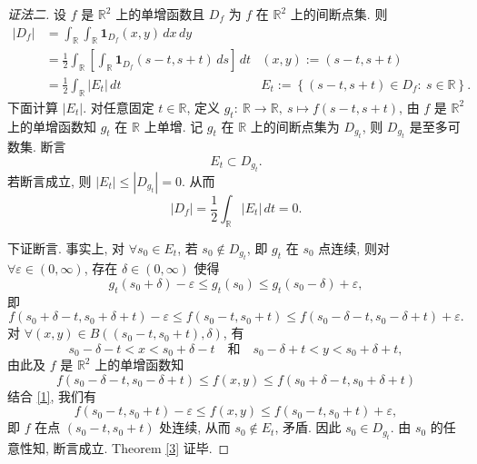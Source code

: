 \documentclass[a4paper,11pt]{article}
\theoremstyle{definition}
\begin{document}
\begin{CJK*}{UTF8}{gbsn}
\begin{proof}[证法二]
    设 $ f $ 是 $ \mathbb{R}^2 $ 上的单增函数且 $ D_f $ 为 $ f $ 在 $ \mathbb{R}^2 $ 上的间断点集.
    则
    \begin{align*}
        |D_f| &= \int_\mathbb{R} \int_\mathbb{R} \mathbf{1}_{D_f}(x, y) \, dx \, dy \\
              &= \frac{1}{2} \int_\mathbb{R} \left[ \int_\mathbb{R} \mathbf{1}_{D_f}(s - t, s + t) \, ds \right] \, dt
                & (x, y) := (s - t, s + t) \\
              &= \frac{1}{2} \int_\mathbb{R} |E_t| \, dt
                & E_t := \left\{ (s - t, s + t) \in D_f :\ s \in \mathbb{R} \right\}.
    \end{align*}
    下面计算 $ |E_t| $. 
    对任意固定 $ t \in \mathbb{R} $, 定义 $ g_t :\ \mathbb{R} \to \mathbb{R},\ s \mapsto f(s - t, s + t) $,
    由 $ f $ 是 $ \mathbb{R}^2 $ 上的单增函数知 $ g_t $ 在 $ \mathbb{R} $ 上单增.
    记 $ g_t $ 在 $ \mathbb{R} $ 上的间断点集为 $ D_{g_t} $, 则 $ D_{g_t} $ 是至多可数集. 断言 
    $$ 
        E_t \subset D_{g_t}.
    $$
    若断言成立, 则 $ |E_t| \leq |D_{g_t}| = 0 $. 从而
    $$
        |D_f| = \frac{1}{2} \int_\mathbb{R} |E_t| \, dt = 0.
    $$
    
    下证断言. 事实上, 对 $ \forall s_0 \in E_t $, 若 $ s_0 \notin D_{g_t} $,
    即 $ g_t $ 在 $ s_0 $ 点连续, 则对 $ \forall \varepsilon \in (0, \infty) $, 存在 $ \delta \in (0, \infty) $
    使得
    $$  
        g_t(s_0 + \delta) - \varepsilon \leq g_t(s_0) \leq g_t(s_0 - \delta) + \varepsilon,
    $$
    即
    \begin{equation}  \label{1}
        f(s_0 + \delta - t, s_0 + \delta + t) - \varepsilon
            \leq f(s_0 - t, s_0 + t) \leq f(s_0 - \delta - t, s_0 - \delta + t) + \varepsilon.
    \end{equation} 
    对 $ \forall (x, y) \in B((s_0 - t, s_0 + t), \delta) $, 有
    $$ 
        s_0 - \delta - t < x < s_0 + \delta - t
        \quad\text{和}\quad
        s_0 - \delta + t < y < s_0 + \delta + t,
    $$
    由此及 $ f $ 是 $ \mathbb{R}^2 $ 上的单增函数知
    $$
        f(s_0 - \delta - t, s_0 - \delta + t) \leq f(x, y) \leq f(s_0 + \delta - t, s_0 + \delta + t)
    $$
    结合 \eqref{1}, 我们有
    $$
        f(s_0 - t, s_0 + t) - \varepsilon \leq f(x, y) \leq f(s_0 - t, s_0 + t) + \varepsilon,
    $$
    即 $ f $ 在点 $ (s_0 - t, s_0 + t) $ 处连续, 从而 $ s_0 \notin E_t $, 矛盾. 因此 $ s_0 \in D_{g_t} $.
    由 $ s_0 $ 的任意性知, 断言成立. 
    Theorem \ref{3} 证毕.
\end{proof}


\end{CJK*}
\end{document}

